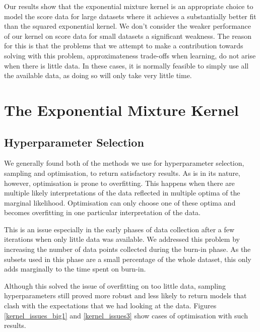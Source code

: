 \documentclass[a4paper,12pt,twoside,openright]{report}
\begin{document}
Our results show that the exponential mixture kernel is an appropriate choice to model the score data for large datasets where it achieves a substantially better fit than the squared exponential kernel. We don't consider the weaker performance of our kernel on score data for small datasets a significant weakness. The reason for this is that the problems that we attempt to make a contribution towards solving with this problem, approximateness trade-offs when learning, do not arise when there is little data. In these cases, it is normally feasible to simply use all the available data, as doing so will only take very little time.



\section{The Exponential Mixture Kernel}

\subsection{Hyperparameter Selection}

We generally found both of the methods we use for hyperparameter selection, sampling and optimisation, to return satisfactory results. As is in its nature, however, optimisation is prone to overfitting. This happens when there are multiple likely interpretations of the data reflected in multiple optima of the marginal likelihood. Optimisation can only choose one of these optima and becomes overfitting in one particular interpretation of the data.

This is an issue especially in the early phases of data collection after a few iterations when only little data was available. We addressed this problem by increasing the number of data points collected during the burn-in phase. As the subsets used in this phase are a small percentage of the whole dataset, this only adds marginally to the time spent on burn-in.

Although this solved the issue of overfitting on too little data, sampling hyperparameters still proved more robust and less likely to return models that clash with the expectations that we had looking at the data. Figures \ref{kernel_issues_big1} and \ref{kernel_issues3} show cases of optimisation with such results.
\end{document}
